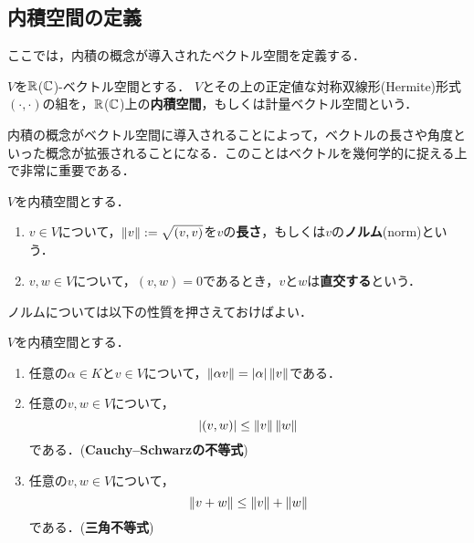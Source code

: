 \subsection{内積空間の定義}
ここでは，内積の概念が導入されたベクトル空間を定義する．
\begin{dfn}
  $V$を$\mathbb{R}$($\mathbb{C}$)-ベクトル空間とする．
  $V$とその上の正定値な対称双線形(Hermite)形式$(\cdot,\cdot)$の組を，$\mathbb{R}$($\mathbb{C}$)上の\textbf{内積空間}，もしくは計量ベクトル空間という．
\end{dfn}
内積の概念がベクトル空間に導入されることによって，ベクトルの長さや角度といった概念が拡張されることになる．このことはベクトルを幾何学的に捉える上で非常に重要である．
\begin{dfn}
$V$を内積空間とする．
\begin{enumerate}
  \item $v \in V$について，$\left\| v \right\|:=\sqrt{(v,v)}$を$v$の\textbf{長さ}，もしくは$v$の\textbf{ノルム}(norm)という．
  \item $v,w \in V$について，$(v,w)=0$であるとき，$v$と$w$は\textbf{直交する}という．
\end{enumerate}
\end{dfn}
ノルムについては以下の性質を押さえておけばよい．
\begin{prop}
$V$を内積空間とする．
\begin{enumerate}
  \item 任意の$\alpha \in K$と$v \in V$について，$\left\| \alpha v \right\| = \left|\alpha\right|\left\| v \right\|$である．
  \item 任意の$v,w \in V$について，
  \[
    \left|(v,w)\right| \le \left\| v \right\|\left\| w \right\|  
  \]
  である．(\textbf{Cauchy--Schwarzの不等式})
  \item 任意の$v,w \in V$について，
  \[
    \left\| v+w \right\| \le \left\| v \right\| + \left\| w \right\|  
  \]
  である．(\textbf{三角不等式})
\end{enumerate}
\end{prop}
